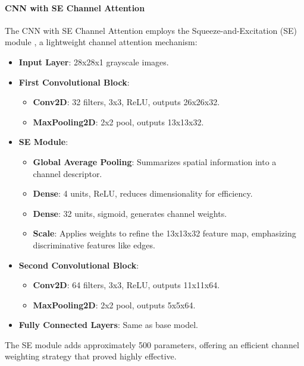 \documentclass[12pt]{article}
\begin{document}
\paragraph{CNN with SE Channel Attention}
The CNN with SE Channel Attention employs the Squeeze-and-Excitation (SE) module \cite{se_paper}, a lightweight channel attention mechanism:
\begin{itemize}
    \item \textbf{Input Layer}: 28x28x1 grayscale images.
    \item \textbf{First Convolutional Block}:
        \begin{itemize}
            \item \textbf{Conv2D}: 32 filters, 3x3, ReLU, outputs 26x26x32.
            \item \textbf{MaxPooling2D}: 2x2 pool, outputs 13x13x32.
        \end{itemize}
    \item \textbf{SE Module}:
        \begin{itemize}
            \item \textbf{Global Average Pooling}: Summarizes spatial information into a channel descriptor.
            \item \textbf{Dense}: 4 units, ReLU, reduces dimensionality for efficiency.
            \item \textbf{Dense}: 32 units, sigmoid, generates channel weights.
            \item \textbf{Scale}: Applies weights to refine the 13x13x32 feature map, emphasizing discriminative features like edges.
        \end{itemize}
    \item \textbf{Second Convolutional Block}:
        \begin{itemize}
            \item \textbf{Conv2D}: 64 filters, 3x3, ReLU, outputs 11x11x64.
            \item \textbf{MaxPooling2D}: 2x2 pool, outputs 5x5x64.
        \end{itemize}
    \item \textbf{Fully Connected Layers}: Same as base model.
\end{itemize}
The SE module adds approximately 500 parameters, offering an efficient channel weighting strategy that proved highly effective.
\end{document}
